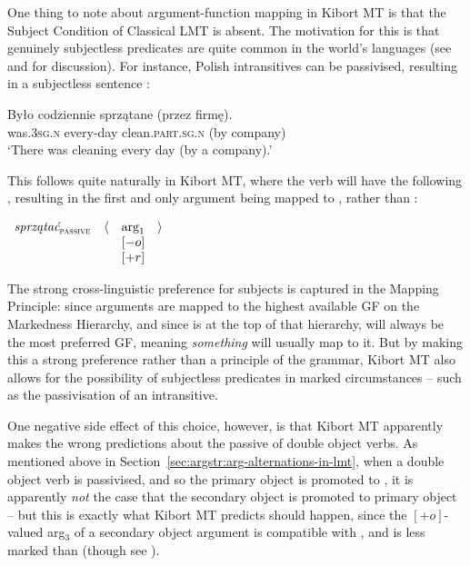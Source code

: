 \documentclass[output=paper]{langscibook}
\begin{document}
One thing to note about argument-function mapping in Kibort MT is that the
Subject Condition of Classical LMT is absent. The motivation for this is that
genuinely subjectless predicates are quite common in the world's languages (see
\citealt{Kibort2006} and \citealt{lowe-etal2021} for discussion). For instance,
Polish intransitives can be passivised, resulting in a subjectless sentence
\citep[304--307]{Kibort2006}:

\begin{exe}
  \ex \label{bylosprzatane-intrans}
  \gll By{\l}o codziennie sprzątane (przez firmę).\\
  was.\textsc{3sg.n} every-day clean.\textsc{part.sg.n} (by company)\\
  \glt `There was cleaning every day (by a company).'
\end{exe}
%
This follows quite naturally in Kibort MT, where the verb will have the
following \astruc, resulting in the first and only argument being mapped to
\OBLTHETA, rather than \SUBJ:

\begin{exe}
  \ex \label{polish-clean-a-struc}%
  \ensuremath{%
    \begin{array}[t]{cccc}
      \textit{sprzątać}_{\textsc{passive}} & \langle & \textnormal{arg}_1 & \rangle\\
                                           &  & [-o]    &   \\
                                           &  & [+r]    &   \\
    \end{array}
  }%
\end{exe}
%
The strong cross-linguistic preference for subjects is captured in the Mapping
Principle: since arguments are mapped to the highest available GF on the
Markedness Hierarchy, and since \SUBJ is at the top of that hierarchy, \SUBJ
will always be the most preferred GF, meaning \emph{something} will usually map
to it. But by making this a strong preference rather than a principle of the
grammar, Kibort MT also allows for the possibility of subjectless predicates in
marked circumstances -- such as the passivisation of an intransitive.

One negative side effect of this choice, however, is that Kibort MT apparently
makes the wrong predictions about the passive of double object verbs. As
mentioned above in Section~\ref{sec:argstr:arg-alternations-in-lmt}, when a double
object verb is passivised, and so the primary object is promoted to \SUBJ, it is
apparently \emph{not} the case that the secondary object is promoted to primary
object -- but this is exactly what Kibort MT predicts should happen, since the
$[+o]$-valued arg$_{3}$ of a secondary object argument is compatible with \OBJ,
and \OBJ is less marked than \OBJTHETA (though see \citealt{Kibort:08}).
\end{document}
